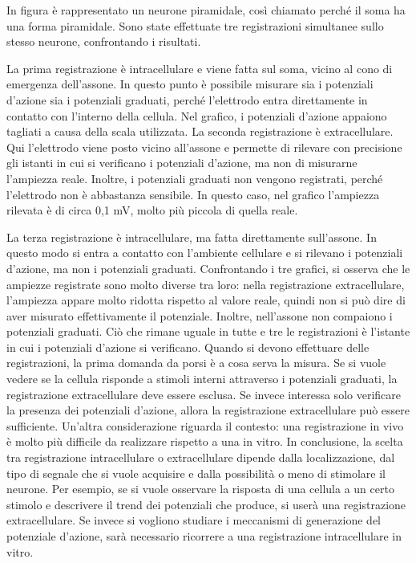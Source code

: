 \documentclass[12pt,a4paper,openany]{book}
\begin{document}
In figura è rappresentato un neurone piramidale, così chiamato perché il soma ha una forma piramidale. Sono state effettuate tre registrazioni simultanee sullo stesso neurone, confrontando i risultati.

La prima registrazione è intracellulare e viene fatta sul soma, vicino al cono di emergenza dell'assone. In questo punto è possibile misurare sia i potenziali d'azione sia i potenziali graduati, perché l'elettrodo entra direttamente in contatto con l'interno della cellula. Nel grafico, i potenziali d'azione appaiono tagliati a causa della scala utilizzata. La seconda registrazione è extracellulare. Qui l'elettrodo viene posto vicino all'assone e permette di rilevare con precisione gli istanti in cui si verificano i potenziali d'azione, ma non di misurarne l'ampiezza reale. Inoltre, i potenziali graduati non vengono registrati, perché l'elettrodo non è abbastanza sensibile. In questo caso, nel grafico l'ampiezza rilevata è di circa 0,1 mV, molto più piccola di quella reale.

La terza registrazione è intracellulare, ma fatta direttamente sull'assone. In questo modo si entra a contatto con l'ambiente cellulare e si rilevano i potenziali d'azione, ma non i potenziali graduati. Confrontando i tre grafici, si osserva che le ampiezze registrate sono molto diverse tra loro: nella registrazione extracellulare, l'ampiezza appare molto ridotta rispetto al valore reale, quindi non si può dire di aver misurato effettivamente il potenziale. Inoltre, nell'assone non compaiono i potenziali graduati. Ciò che rimane uguale in tutte e tre le registrazioni è l'istante in cui i potenziali d'azione si verificano. Quando si devono effettuare delle registrazioni, la prima domanda da porsi è a cosa serva la misura. Se si vuole vedere se la cellula risponde a stimoli interni attraverso i potenziali graduati, la registrazione extracellulare deve essere esclusa. Se invece interessa solo verificare la presenza dei potenziali d'azione, allora la registrazione extracellulare può essere sufficiente. Un'altra considerazione riguarda il contesto: una registrazione in vivo è molto più difficile da realizzare rispetto a una in vitro. In conclusione, la scelta tra registrazione intracellulare o extracellulare dipende dalla localizzazione, dal tipo di segnale che si vuole acquisire e dalla possibilità o meno di stimolare il neurone. Per esempio, se si vuole osservare la risposta di una cellula a un certo stimolo e descrivere il trend dei potenziali che produce, si userà una registrazione extracellulare. Se invece si vogliono studiare i meccanismi di generazione del potenziale d'azione, sarà necessario ricorrere a una registrazione intracellulare in vitro.
\end{document}
